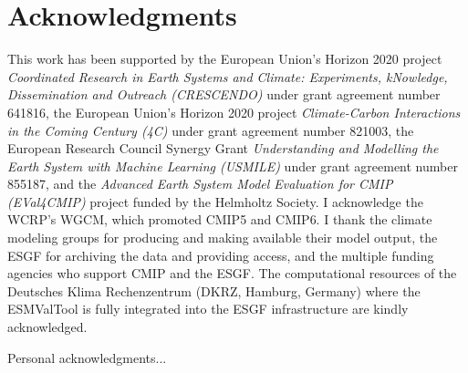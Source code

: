 
%



\chapter{Acknowledgments}

This work has been supported by the European Union's Horizon 2020 project
\emph{Coordinated Research in Earth Systems and Climate: Experiments,
  kNowledge, Dissemination and Outreach (CRESCENDO)} under grant agreement
number 641816, the European Union's Horizon 2020 project \emph{Climate-Carbon
  Interactions in the Coming Century (4C)} under grant agreement number 821003,
the European Research Council Synergy Grant \emph{Understanding and Modelling
  the Earth System with Machine Learning (USMILE)} under grant agreement number
855187, and the \emph{Advanced Earth System Model Evaluation for CMIP
  (EVal4CMIP)} project funded by the Helmholtz Society. I acknowledge the
\ac{WCRP}'s \ac{WGCM}, which promoted \acs{CMIP}5 and \acs{CMIP}6. I thank the
climate modeling groups for producing and making available their model output,
the \ac{ESGF} for archiving the data and providing access, and the multiple
funding agencies who support \ac{CMIP} and the \ac{ESGF}. The computational
resources of the Deutsches Klima Rechenzentrum (DKRZ, Hamburg, Germany) where
the \ac{ESMValTool} is fully integrated into the \ac{ESGF} infrastructure are
kindly acknowledged.

Personal acknowledgments...
